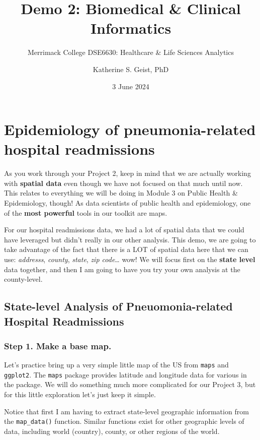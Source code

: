 \documentclass[
]{article}
\title{Demo 2: Biomedical \& Clinical Informatics}
\subtitle{Merrimack College DSE6630: Healthcare \& Life Sciences
Analytics}
\author{Katherine S. Geist, PhD}
\date{3 June 2024}
\begin{document}
\maketitle

{
\setcounter{tocdepth}{2}
\tableofcontents
}
\section{Epidemiology of pneumonia-related hospital
readmissions}\label{epidemiology-of-pneumonia-related-hospital-readmissions}

As you work through your Project 2, keep in mind that we are actually
working with \textbf{spatial data} even though we have not focused on
that much until now. This relates to everything we will be doing in
Module 3 on Public Health \& Epidemiology, though! As data scientists of
public health and epidemiology, one of the \textbf{most powerful} tools
in our toolkit are maps.

For our hospital readmissions data, we had a lot of spatial data that we
could have leveraged but didn't really in our other analysis. This demo,
we are going to take advantage of the fact that there is a LOT of
spatial data here that we can use: \emph{addresss}, \emph{county},
\emph{state}, \emph{zip code}\ldots{} wow! We will focus first on the
\textbf{state level} data together, and then I am going to have you try
your own analysis at the county-level.

\subsection{State-level Analysis of Pneuomonia-related Hospital
Readmissions}\label{state-level-analysis-of-pneuomonia-related-hospital-readmissions}

\subsubsection{Step 1. Make a base map.}\label{step-1.-make-a-base-map.}

Let's practice bring up a very simple little map of the US from
\texttt{maps} and \texttt{ggplot2}. The \texttt{maps} package provides
latitude and longitude data for various in the package. We will do
something much more complicated for our Project 3, but for this little
exploration let's just keep it simple.

Notice that first I am having to extract state-level geographic
information from the \texttt{map\_data()} function. Similar functions
exist for other geographic levels of data, including world (country),
county, or other regions of the world.
\end{document}
